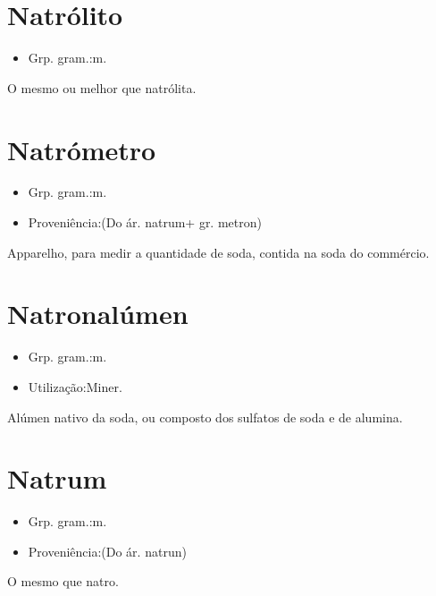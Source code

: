 \section{Natrólito}
\begin{itemize}
\item {Grp. gram.:m.}
\end{itemize}
O mesmo ou melhor que \textunderscore natrólita\textunderscore .
\section{Natrómetro}
\begin{itemize}
\item {Grp. gram.:m.}
\end{itemize}
\begin{itemize}
\item {Proveniência:(Do ár. \textunderscore natrum\textunderscore  + gr. \textunderscore metron\textunderscore )}
\end{itemize}
Apparelho, para medir a quantidade de soda, contida na soda do commércio.
\section{Natronalúmen}
\begin{itemize}
\item {Grp. gram.:m.}
\end{itemize}
\begin{itemize}
\item {Utilização:Miner.}
\end{itemize}
Alúmen nativo da soda, ou composto dos sulfatos de soda e de alumina.
\section{Natrum}
\begin{itemize}
\item {Grp. gram.:m.}
\end{itemize}
\begin{itemize}
\item {Proveniência:(Do ár. \textunderscore natrun\textunderscore )}
\end{itemize}
O mesmo que \textunderscore natro\textunderscore .
